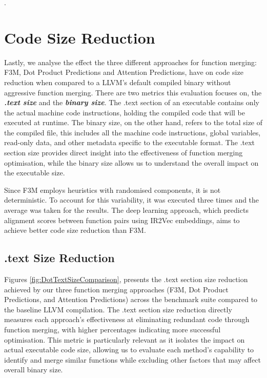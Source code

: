 

.


\section{Code Size Reduction}
Lastly, we analyse the effect the three different approaches for function merging: F3M, Dot Product Predictions and Attention Predictions, have on code size reduction when compared to a LLVM's default compiled binary without aggressive function merging. There are two metrics this evaluation focuses on, the \textbf{\textit{.text size}} and the \textbf{\textit{binary size}}. The .text section of an executable contains only the actual machine code instructions, holding the compiled code that will be executed at runtime. The binary size, on the other hand, refers to the total size of the compiled file, this includes all the machine code instructions, global variables, read-only data, and other metadata specific to the executable format. The .text section size provides direct insight into the effectiveness of function merging optimisation, while the binary size allows us to understand the overall impact on the executable size.

Since F3M employs heuristics with randomised components, it is not deterministic. To account for this variability, it was executed three times and the average was taken for the results. The deep learning approach, which predicts alignment scores between function pairs using IR2Vec embeddings, aims to achieve better code size reduction than F3M.

\subsection{.text Size Reduction}
Figures \ref{fig:DotTextSizeComparison}, presents the .text section size reduction achieved by our three function merging approaches (F3M, Dot Product Predictions, and Attention Predictions) across the benchmark suite compared to the baseline LLVM compilation. The .text section size reduction directly measures each approach's effectiveness at eliminating redundant code through function merging, with higher percentages indicating more successful optimisation. This metric is particularly relevant as it isolates the impact on actual executable code size, allowing us to evaluate each method's capability to identify and merge similar functions while excluding other factors that may affect overall binary size.


